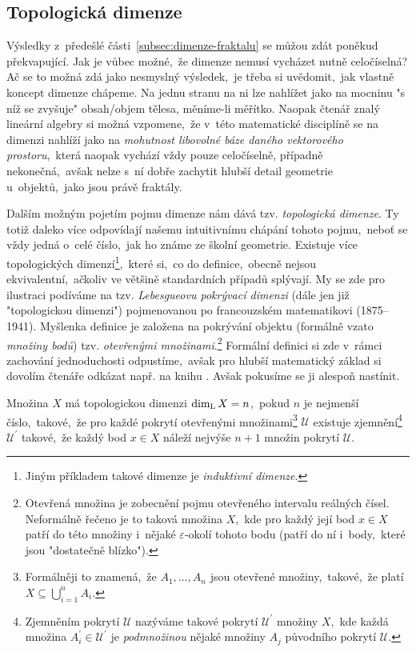 \subsection{Topologická dimenze}\label{subsec:topologicka-dimenze}

Výsledky z~předešlé části~\ref{subsec:dimenze-fraktalu} se můžou zdát poněkud překvapující. Jak je vůbec možné,~že dimenze nemusí vycházet nutně celočíselná? Ač se to možná zdá jako nesmyslný výsledek,~je třeba si uvědomit,~jak vlastně koncept dimenze chápeme. Na jednu stranu na ni lze nahlížet jako na mocninu "s níž se zvyšuje" obsah/objem tělesa, měníme-li měřítko. Naopak čtenář znalý lineární algebry si možná vzpomene,~že v~této matematické disciplíně se na dimenzi nahlíží jako na \emph{mohutnost libovolné báze daného vektorového prostoru},~která naopak vychází vždy pouze celočíselně, případně nekonečná,~avšak nelze s~ní dobře zachytit hlubší detail geometrie u~objektů,~jako jsou právě fraktály.

Dalším možným pojetím pojmu dimenze nám dává tzv. \emph{topologická dimenze}. Ty totiž daleko více odpovídají našemu intuitivnímu chápání tohoto pojmu,~neboť se vždy jedná o~celé číslo,~jak ho známe ze školní geometrie. Existuje více topologických dimenzí\footnote{Jiným příkladem takové dimenze je \emph{induktivní dimenze}.},~které si,~co do definice,~obecně nejsou ekvivalentní,~ačkoliv ve většině standardních případů splývají. My se zde pro ilustraci podíváme na tzv. \emph{Lebesgueovu pokrývací dimenzi} (dále jen již "topologickou dimenzi") pojmenovanou po francouzském matematikovi  (1875--1941). Myšlenka definice je založena na pokrývání objektu (formálně vzato \emph{množiny bodů}) tzv. \emph{otevřenými množinami}.\footnote{Otevřená množina je zobecnění pojmu otevřeného intervalu reálných čísel. Neformálně řečeno je to taková množina $X$,~kde pro každý její bod $x\in X$ patří do této množiny i~nějaké $\varepsilon$-okolí tohoto bodu (patří do ní i~body,~které jsou "dostatečně blízko").} Formální definici si zde v~rámci zachování jednoduchosti odpustíme,~avšak pro hlubší matematický základ si dovolím čtenáře odkázat např. na knihu \cite{Engelking1989}. Avšak pokusíme se ji alespoň nastínit.

Množina $X$ má topologickou dimenzi $\operatorname{dim_L}{X}=n$,~pokud $n$ je nejmenší číslo,~takové,~že pro každé pokrytí otevřenými množinami\footnote{Formálněji to znamená,~že $A_1,\dots,A_n$ jsou otevřené množiny,~takové,~že platí $X\subseteq\bigcup_{i=1}^n{A_i}$.} $\mathcal{U}$ existuje zjemnění\footnote{Zjemněním pokrytí $\mathcal{U}$ nazýváme takové pokrytí $\mathcal{U}^\prime$ množiny $X$,~kde každá množina $A_i^\prime\in\mathcal{U}^\prime$ je \emph{podmnožinou} nějaké množiny $A_j$ původního pokrytí $\mathcal{U}$.} $\mathcal{U}^\prime$ takové,~že každý bod $x\in X$ náleží nejvýše $n+1$ množin pokrytí $\mathcal{U}$.

